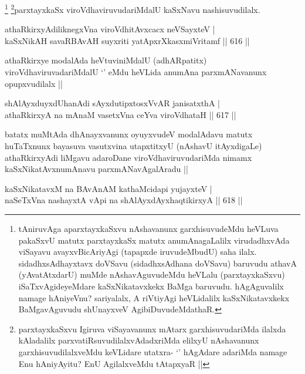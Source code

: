 \begin{artha}
\footnote{tAniruvAga aparxtayxkaSxvu nAshavanunx garxhisuvudeMdu heVLuva pakaSxvU matutx parxtayxkaSx matutx anumAnagaLalilx virudadhxvAda viSayavu avayxvBicAriyAgi (tapapxde iruvudeMbudU) saha ilalx. sidadhxsAdhayxtavx doVSavu (sidadhxsAdhana doVSavu) baruvudu athavA (yAvatAtxdarU) muMde nAshavAguvudeMdu heVLalu (parxtayxkaSxvu) iSaTxvAgideyeMdare kaSxNikatavxkekx BaMga baruvudu. hAgAguvalilx namage hAniyeVnu? sariyalalx, A riVtiyAgi heVLidalilx kaSxNikatavxkekx BaMgavAguvudu shUnayxveV AgibiDuvudeMdathaR.}
\footnote{parxtayxkaSxvu Igiruva viSayavanunx mAtarx garxhisuvudariMda ilalxda kAladalilx parxvatiRsuvudilalxvAdadxriMda elilxyU nAshavanunx garxhisuvudilalxveMdu keVLidare utatxra- `\stext' hAgAdare adariMda namage Enu hAniyAyitu? EnU AgilalxveMdu tAtapxyaR ||}parxtayxkaSx viroVdhaviruvudariMdalU kaSxNavu nashisuvudilalx.
\end{artha}

\begin{shl}
athaRkirxyAdiliknegxVna viroVdhitAvxcacx neVSayxteV | \\
kaSxNikAH savaRBAvAH suyxriti yatApxrXkasxmiVritamf \hfill||  616 || 
\end{shl}

\begin{artha}
athaRkirxye modalAda heVtuviniMdalU (adhARpatitx) viroVdhaviruvadariMdalU `\stext' eMdu heVLida anumAna parxmANavanunx opupxvudilalx ||
\end{artha}


\begin{shl}
shAlAyxduyxdUhanAdi sAyxdutipxtosxVvAR janisatxthA | \\
athaRkirxyA na mAnaM vasetxVna ceYva viroVdhataH \hfill||  617 ||  
\end{shl}

\begin{artha}
batatx muMtAda dhAnayxvanunx oyuyxvudeV modalAdavu matutx huTaTxnunx bayasuva vasutxvina utapxtitxyU (nAshavU itAyxdigaLe) athaRkirxyAdi liMgavu adaroDane viroVdhaviruvudariMda nimamx kaSxNikatAvxnumAnavu parxmANavAgalAradu ||
\end{artha}

\begin{shl}
kaSxNikatavxM na BAvAnAM kathaMcidapi yujayxteV | \\
naSeTxVna nashayxtA vA\s pi na shAlAyxdAyxhaqtikirxyA \hfill||  618 ||  
\end{shl}

